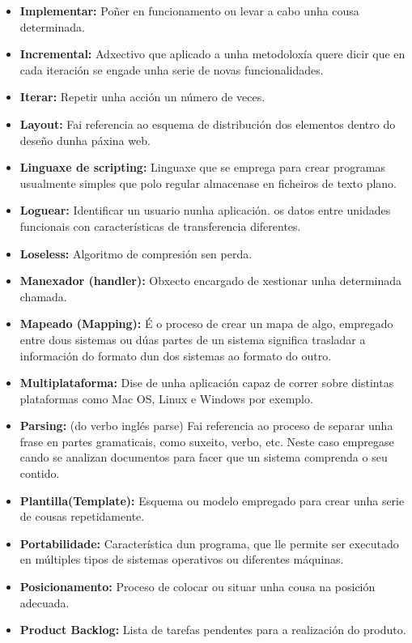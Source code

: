 \begin{itemize}
    \item \textbf{Implementar:} Poñer en funcionamento ou levar a cabo unha cousa determinada.    
    \item \textbf{Incremental:} Adxectivo que aplicado a unha metodoloxía quere dicir que en cada iteración
        se engade unha serie de novas funcionalidades. 
    \item \textbf{Iterar:} Repetir unha acción un número de veces. 
    \item \textbf{Layout:} Fai referencia ao esquema de distribución dos elementos dentro do deseño dunha 
        páxina web.
    \item \textbf{Linguaxe de scripting:} Linguaxe que se emprega para crear programas usualmente simples
        que polo regular almacenase en ficheiros de texto plano.
    \item \textbf{Loguear:} Identificar un usuario nunha aplicación.
        os datos entre unidades funcionais con características de transferencia diferentes.
    \item \textbf{Loseless:} Algoritmo de compresión sen perda.
    \item \textbf{Manexador (handler):} Obxecto encargado de xestionar unha determinada chamada.    
    \item \textbf{Mapeado (Mapping):} É o proceso de crear un mapa de algo, empregado entre dous sistemas ou
        dúas partes de un sistema significa trasladar a información do formato dun dos sistemas ao 
        formato do outro.
    \item \textbf{Multiplataforma:} Dise de unha aplicación capaz de correr sobre distintas plataformas como
        Mac OS, Linux e Windows por exemplo.
    \item \textbf{Parsing:} (do verbo inglés parse) Fai referencia ao proceso de separar unha frase en partes
        gramaticais, como suxeito, verbo, etc. Neste caso empregase cando se analizan documentos 
        para facer que un sistema comprenda o seu contido.
    \item \textbf{Plantilla(Template):} Esquema ou modelo empregado para crear unha serie de cousas 
        repetidamente.    
    \item \textbf{Portabilidade:} Característica dun programa, que lle permite ser executado en múltiples 
        tipos de sistemas operativos ou diferentes máquinas.
    \item \textbf{Posicionamento:} Proceso de colocar ou situar unha cousa na posición adecuada.
    \item \textbf{Product Backlog:} Lista de tarefas pendentes para a realización do produto.

\end{itemize}
